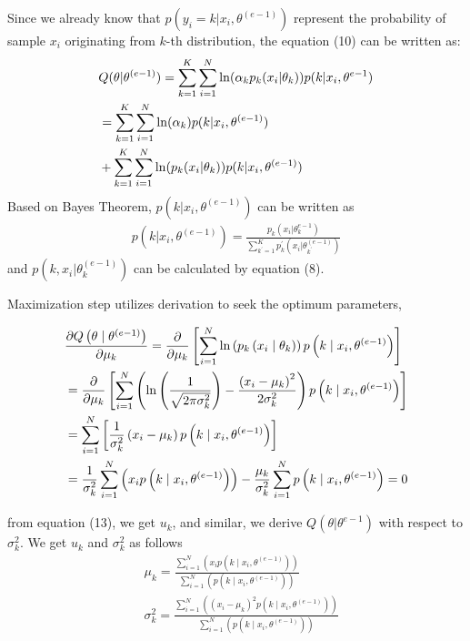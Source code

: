 \documentclass[conference]{IEEEtran}
\begin{document}
Since we already know that $ p(y_i = k|x_i,\theta^{(e-1)})$ represent the 
probability of sample $x_i$ originating 
from $k$-th distribution, the equation (10) can be written as:
\begin{align}
  &Q(\theta|\theta^{(e-1)}) = \sum_{k=1}^{K} \sum_{i=1}^{N} \ln (\alpha_k p_k (x_i|\theta_k)) p(k|x_i,\theta^{e-1}) \notag  \\ 
  &=\sum_{k=1}^{K} \sum_{i=1}^{N} \ln (\alpha_k) p(k|x_i,\theta^{(e-1)}) \notag  \\
  & +\sum_{k=1}^{K} \sum_{i=1}^{N} \ln (p_k(x_i|\theta_k)) p(k|x_i,\theta^{(e-1)}) 
\end{align}
Based on Bayes Theorem, $p(k|x_i,\theta^{(e-1)}) $ can be written as 
\begin{align} 
p(k|x_i,\theta^{(e-1)}) 
= \frac{p_k(x_i|\theta_{k}^{e-1})}{\sum_{k^{'}=1}^{K} p_{k}^{'}(x_i|\theta_{k^{'}}^{(e-1)})}
\end{align}
and $p(k,x_i|\theta_{k}^{(e-1)})$ can be calculated by equation (8).

Maximization step utilizes derivation to seek the optimum parameters, 
\begin{small}
\begin{align}
  &\frac{\partial Q\left(\theta \mid \theta^{(e-1)}\right)}{\partial \mu_{k}}
    =\frac{\partial}{\partial \mu_{k}}\left[\sum_{i=1}^{N} \ln \left(p_{k}\left(x_{i} \mid \theta_{k}\right)\right) p\left(k \mid x_{i}, \theta^{(e-1)}\right)\right] \notag \\
    &=\frac{\partial}{\partial \mu_{k}}\left[\sum_{i=1}^{N}\left(\ln \left(\frac{1}{\sqrt{2 \pi \sigma_{k}^{2}}}\right)-\frac{\left(x_{i}-\mu_{k}\right)^{2}}{2 \sigma_{k}^{2}}\right) p\left(k \mid x_{i}, \theta^{(e-1)}\right)\right] \notag \\
    &=\sum_{i=1}^{N}\left[\frac{1}{\sigma_{k}^{2}}\left(x_{i}-\mu_{k}\right) p\left(k \mid x_{i}, \theta^{(e-1)}\right)\right] \notag \\
    &=\frac{1}{\sigma_{k}^{2}} \sum_{i=1}^{N}\left(x_{i} p\left(k \mid x_{i}, \theta^{(e-1)}\right)\right)-\frac{\mu_{k}}{\sigma_{k}^{2}} \sum_{i=1}^{N} p\left(k \mid x_{i}, \theta^{(e-1)}\right) =0 
\end{align}
\end{small}
from equation (13), we get $u_k$, and similar, we derive $Q(\theta|\theta^{e-1})$ with respect to $\sigma_k^{2}$. 
We get $u_k$ and $\sigma_k^{2}$ as follows
\begin{align}
  &\mu_{k}=\frac{\sum_{i=1}^{N}\left(x_{i} p\left(k \mid x_{i}, \theta^{(e-1)}\right)\right)}{\sum_{i=1}^{N}\left(p\left(k \mid x_{i}, \theta^{(e-1)}\right)\right)}\\
  &\sigma_{k}^{2}=\frac{\sum_{i=1}^{N}\left(\left(x_{i}-\mu_{k}\right)^{2} p\left(k \mid x_{i}, \theta^{(e-1)}\right)\right)}{\sum_{i=1}^{N}\left(p\left(k \mid x_{i}, \theta^{(e-1)}\right)\right)}
\end{align}
\end{document}

